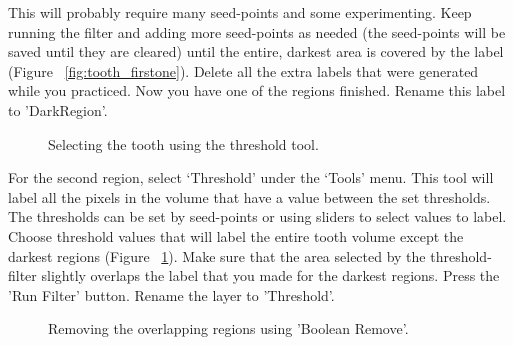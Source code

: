 \documentclass[fleqn,12pt,openany]{book}
\begin{document}
 This will probably require many seed-points and some experimenting. Keep 
 running the filter and adding more seed-points as needed (the seed-points will 
 be saved until they are cleared) until the entire, darkest area is covered by 
 the label (Figure ~\ref{fig:tooth_firstone}). Delete all the extra labels 
 that were generated while you practiced. Now you have one of the regions finished. Rename
 this label to 'DarkRegion'.

\begin{figure}
\caption{\label{fig:tooth_threshold} Selecting the tooth using the threshold tool.}
\end{figure} 

For the second region, select `Threshold' under the `Tools' menu.
This tool will label all the pixels in the volume that have a value between the 
set thresholds. The thresholds can be set by seed-points or using
sliders to select values to label. Choose threshold values that will label 
the entire tooth volume except the darkest regions 
(Figure ~\ref{fig:tooth_threshold}). Make sure that the area selected by the 
threshold-filter slightly overlaps the label that you made for the darkest regions. Press the 'Run Filter' button. Rename the layer to 'Threshold'.

\begin{figure}
\caption{\label{fig:tooth_remove_during} Removing the overlapping regions using 'Boolean Remove'.}
\end{figure} 
\end{document}
